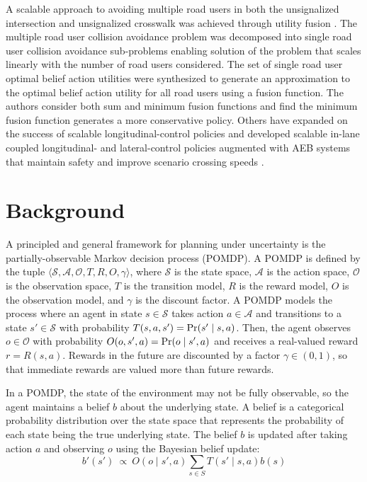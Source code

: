 \documentclass[conference]{IEEEtran}
\begin{document}
A scalable approach to avoiding multiple road users in both the unsignalized intersection and unsignalized crosswalk was achieved through utility fusion \cite{Bouton2018ScalableDriving}. The multiple road user collision avoidance problem was decomposed into single road user collision avoidance sub-problems enabling solution of the problem that scales linearly with the number of road users considered. The set of single road user optimal belief action utilities were synthesized to generate an approximation to the optimal belief action utility for all road users using a fusion function. The authors consider both sum and minimum fusion functions and find the minimum fusion function generates a more conservative policy. Others have expanded on the success of scalable longitudinal-control policies and developed scalable in-lane coupled longitudinal- and lateral-control policies augmented with AEB systems that maintain safety and improve scenario crossing speeds \cite{Schratter2019PedestrianOcclusions}.



\section{Background}
\label{sec:background}

A principled and general framework for planning under uncertainty is the partially-observable Markov decision process (POMDP). A POMDP is defined by the tuple $\langle \mathcal{S},\mathcal{A}, \mathcal{O}, T, R, O, \gamma \rangle$, where $\mathcal{S}$ is the state space, $\mathcal{A}$ is the action space, $\mathcal{O}$ is the observation space, $T$ is the transition model, $R$ is the reward model, $O$ is the observation model, and $\gamma$ is the discount factor. A POMDP models the process where an agent in state $s \in \mathcal{S}$ takes action $a \in \mathcal{A}$ and transitions to a state $s' \in \mathcal{S}$ with probability $T(s, a, s') = \textnormal{Pr}(s' \mid s, a)$. Then, the agent observes $o \in \mathcal{O}$ with probability $O(o, s',a) = \textnormal{Pr}(o\mid s', a)$ and receives a real-valued reward $r = R(s, a)$. Rewards in the future are discounted by a factor $\gamma \in (0,1)$, so that immediate rewards are valued more than future rewards.

In a POMDP, the state of the environment may not be fully observable, so the agent maintains a belief $b$ about the underlying state. A belief is a categorical probability distribution over the state space that represents the probability of each state being the true underlying state. The belief $b$ is updated after taking action $a$ and observing $o$ using the Bayesian belief update:
\begin{equation}
    b'(s')~\propto~O(o \mid s', a) \sum_{s \in S} T(s' \mid s, a) b(s)
\end{equation}
\end{document}
